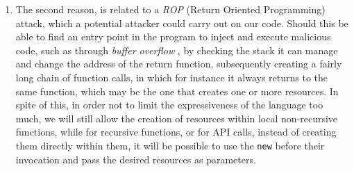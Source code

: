 \begin{note}
\begin{enumerate}[label=(\roman*)]
        \item The second reason, is related to a \emph{ROP} (Return Oriented Programming) \cite{rop} attack, which a potential attacker could carry out on our code. Should this be able to find an entry point in the program to inject and execute malicious code, such as through \emph{buffer overflow} \cite{buffer}, by checking the stack it can manage and change the address of the return function, subsequently creating a fairly long chain of function calls, in which for instance it always returns to the same function, which may be the one that creates one or more resources. In spite of this, in order not to limit the expressiveness of the language too much, we will still allow the creation of resources within local non-recursive functions, while for recursive functions, or for API calls, instead of creating them directly within them, it will be possible to use the \verb|new| before their invocation and pass the desired resources as parameters.
    \end{enumerate}
\end{note}

